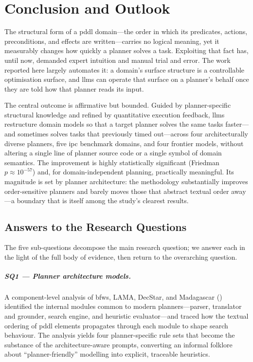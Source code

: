
\chapter{Conclusion and Outlook}\label{ch:conclusion}

The structural form of a \gls{pddl} domain---the order in which its predicates, actions, preconditions, and effects are written---carries no logical meaning, yet it measurably changes how quickly a planner solves a task.
Exploiting that fact has, until now, demanded expert intuition and manual trial and error.
The work reported here largely automates it: a domain's surface structure is a controllable optimisation surface, and \glspl{llm} can operate that surface on a planner's behalf once they are told how that planner reads its input.

The central outcome is affirmative but bounded.
Guided by planner-specific structural knowledge and refined by quantitative execution feedback, \glspl{llm} restructure domain models so that a target planner solves the same tasks faster---and sometimes solves tasks that previously timed out---across four architecturally diverse planners, five \gls{ipc} benchmark domains, and four frontier models, without altering a single line of planner source code or a single symbol of domain semantics.
The improvement is highly statistically significant (Friedman $p \approx 10^{-57}$) and, for domain-independent planning, practically meaningful.
Its magnitude is set by planner architecture: the methodology substantially improves order-sensitive planners and barely moves those that abstract textual order away---a boundary that is itself among the study's clearest results.

\section{Answers to the Research Questions}
\label{sec:concl:rq_answers}

The five sub-questions decompose the main research question; we answer each in the light of the full body of evidence, then return to the overarching question.

\paragraph{SQ1 --- Planner architecture models.}
A component-level analysis of \gls{bfws}, LAMA, DecStar, and Madagascar () identified the internal modules common to modern planners---parser, translator and grounder, search engine, and heuristic evaluator---and traced how the textual ordering of \gls{pddl} elements propagates through each module to shape search behaviour.
The analysis yields four planner-specific rule sets that become the substance of the architecture-aware prompts, converting an informal folklore about ``planner-friendly'' modelling into explicit, traceable heuristics.


